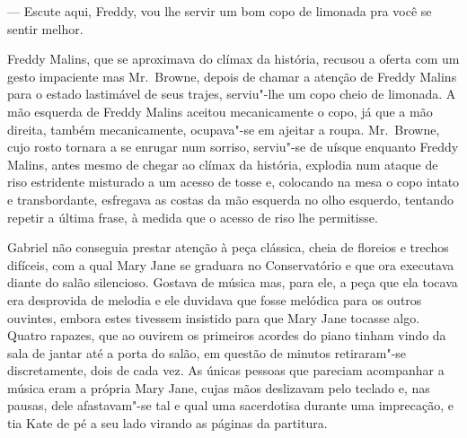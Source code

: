 --- Escute aqui, Freddy, vou lhe servir um bom copo de limonada pra você se
sentir melhor.

Freddy Malins, que se aproximava do clímax da história, recusou a oferta com um
gesto impaciente mas Mr.~Browne, depois de chamar a atenção de Freddy Malins
para o estado lastimável de seus trajes, serviu"-lhe um copo cheio de limonada.
A mão esquerda de Freddy Malins aceitou mecanicamente o copo, já que a mão
direita, também mecanicamente, ocupava"-se em ajeitar a roupa.  Mr.~Browne, cujo
rosto tornara a se enrugar num sorriso, serviu"-se de uísque enquanto Freddy
Malins, antes mesmo de chegar ao clímax da história, explodia num ataque de
riso estridente misturado a um acesso de tosse e, colocando na mesa o copo
intato e transbordante, esfregava as costas da mão esquerda no olho esquerdo,
tentando repetir a última frase, à medida que o acesso de riso lhe permitisse.

\smallskip

\noindent\dotfill

\smallskip

Gabriel não conseguia prestar atenção à peça clássica, cheia de floreios e
trechos difíceis, com a qual Mary Jane se graduara no Conservatório e que ora
executava diante do salão silencioso.  Gostava de música mas, para ele, a peça
que ela tocava era desprovida de melodia e ele duvidava que fosse melódica para
os outros ouvintes, embora estes tivessem insistido para que Mary Jane tocasse
algo.  Quatro rapazes, que ao ouvirem os primeiros acordes do piano tinham
vindo da sala de jantar até a porta do salão, em questão de minutos
retiraram"-se discretamente, dois de cada vez.  As únicas pessoas que pareciam
acompanhar a música eram a própria Mary Jane, cujas mãos deslizavam pelo
teclado e, nas pausas, dele afastavam"-se tal e qual uma sacerdotisa durante uma
imprecação, e tia Kate de pé a seu lado virando as páginas da partitura.

